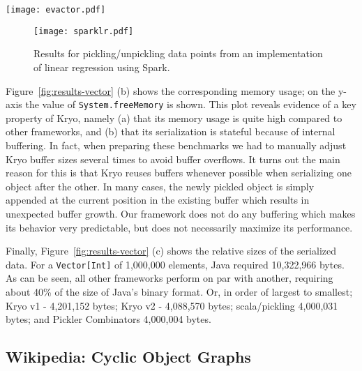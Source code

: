 \begin{figure*}[ht!]
 \centering
 \texttt{[image: evactor.pdf]}
 \caption{Results for pickling/unpickling evactor datatypes (numerous tiny messages represented as case classes containing primitive fields.) Figure~\ref{fig:evactor}(a) shows a benchmark which pickles/unpickles up to 10,000 evactor messages. Java runs out of memory at this point. Figure~\ref{fig:evactor}(b) removes Java and scales up the benchmark to more evactor events.}
 \label{fig:evactor}
\end{figure*}

\begin{figure}[ht!]
 \centering
 \texttt{[image: sparklr.pdf]}
 \caption{Results for pickling/unpickling data points from an implementation of linear regression using Spark.}
 \label{fig:spark}
\end{figure}

Figure~\ref{fig:results-vector} (b) shows the corresponding memory usage; on the
y-axis the value of \texttt{System.freeMemory} is shown. This plot
reveals evidence of a key property of Kryo, namely (a) that its memory usage
is quite high compared to other frameworks, and (b) that its
serialization is stateful because of internal buffering. In fact, when
preparing these benchmarks we had to manually adjust Kryo buffer sizes
several times to avoid buffer overflows. It turns out the main reason
for this is that Kryo reuses buffers whenever possible when
serializing one object after the other. In many cases, the
newly pickled object is simply appended at the current position in the
existing buffer which results in unexpected buffer growth. Our
framework does not do any buffering which makes its behavior very
predictable, but does not necessarily maximize its performance.

Finally, Figure~\ref{fig:results-vector} (c) shows the relative sizes of the serialized data. For a \verb|Vector[Int]| of 1,000,000 elements, Java required 10,322,966 bytes. As can be seen, all other frameworks perform on par with another, requiring about 40\% of the size of Java's binary format. Or, in order of largest to smallest; Kryo v1 - 4,201,152 bytes; Kryo v2 - 4,088,570 bytes; scala/pickling 4,000,031 bytes; and Pickler Combinators 4,000,004 bytes.

\subsection{Wikipedia: Cyclic Object Graphs}

